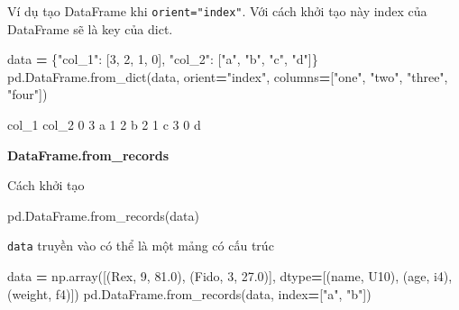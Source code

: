 \documentclass[
]{book}
\newenvironment{Shaded}{\begin{snugshade}}{\end{snugshade}}
\newcommand{\DecValTok}[1]{\textcolor[rgb]{0.00,0.00,0.81}{#1}}
\newcommand{\FloatTok}[1]{\textcolor[rgb]{0.00,0.00,0.81}{#1}}
\newcommand{\NormalTok}[1]{#1}
\newcommand{\OperatorTok}[1]{\textcolor[rgb]{0.81,0.36,0.00}{\textbf{#1}}}
\newcommand{\StringTok}[1]{\textcolor[rgb]{0.31,0.60,0.02}{#1}}
\begin{document}
Ví dụ tạo DataFrame khi \texttt{orient="index"}. Với cách khởi tạo này index của DataFrame sẽ là key của dict.

\begin{Shaded}
\begin{Highlighting}[]
\NormalTok{data }\OperatorTok{=}\NormalTok{ \{}\StringTok{"col\_1"}\NormalTok{: [}\DecValTok{3}\NormalTok{, }\DecValTok{2}\NormalTok{, }\DecValTok{1}\NormalTok{, }\DecValTok{0}\NormalTok{], }\StringTok{"col\_2"}\NormalTok{: [}\StringTok{"a"}\NormalTok{, }\StringTok{"b"}\NormalTok{, }\StringTok{"c"}\NormalTok{, }\StringTok{"d"}\NormalTok{]\}}
\NormalTok{pd.DataFrame.from\_dict(data, orient}\OperatorTok{=}\StringTok{"index"}\NormalTok{, }
\NormalTok{                               columns}\OperatorTok{=}\NormalTok{[}\StringTok{"one"}\NormalTok{, }\StringTok{"two"}\NormalTok{, }\StringTok{"three"}\NormalTok{, }\StringTok{"four"}\NormalTok{])}
\end{Highlighting}
\end{Shaded}

\begin{Shaded}
\begin{Highlighting}[]
\NormalTok{   col\_1 col\_2}
\DecValTok{0}      \DecValTok{3}\NormalTok{     a}
\DecValTok{1}      \DecValTok{2}\NormalTok{     b}
\DecValTok{2}      \DecValTok{1}\NormalTok{     c}
\DecValTok{3}      \DecValTok{0}\NormalTok{     d}
\end{Highlighting}
\end{Shaded}

\textbf{DataFrame.from\_records}

Cách khởi tạo

\begin{Shaded}
\begin{Highlighting}[]
\NormalTok{pd.DataFrame.from\_records(data)}
\end{Highlighting}
\end{Shaded}

\texttt{data} truyền vào có thể là một mảng có cấu trúc

\begin{Shaded}
\begin{Highlighting}[]
\NormalTok{data }\OperatorTok{=}\NormalTok{ np.array([(}\StringTok{\textquotesingle{}Rex\textquotesingle{}}\NormalTok{, }\DecValTok{9}\NormalTok{, }\FloatTok{81.0}\NormalTok{), (}\StringTok{\textquotesingle{}Fido\textquotesingle{}}\NormalTok{, }\DecValTok{3}\NormalTok{, }\FloatTok{27.0}\NormalTok{)],}
\NormalTok{                        dtype}\OperatorTok{=}\NormalTok{[(}\StringTok{\textquotesingle{}name\textquotesingle{}}\NormalTok{, }\StringTok{\textquotesingle{}U10\textquotesingle{}}\NormalTok{), (}\StringTok{\textquotesingle{}age\textquotesingle{}}\NormalTok{, }\StringTok{\textquotesingle{}i4\textquotesingle{}}\NormalTok{), (}\StringTok{\textquotesingle{}weight\textquotesingle{}}\NormalTok{, }\StringTok{\textquotesingle{}f4\textquotesingle{}}\NormalTok{)])}
\NormalTok{pd.DataFrame.from\_records(data, index}\OperatorTok{=}\NormalTok{[}\StringTok{"a"}\NormalTok{, }\StringTok{"b"}\NormalTok{])}
\end{Highlighting}
\end{Shaded}
\end{document}
